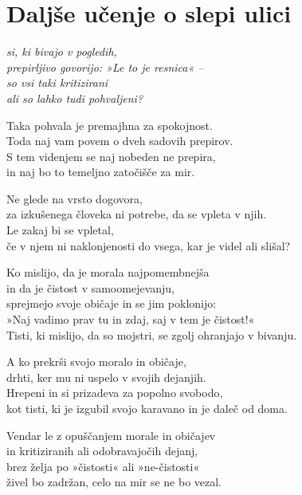 \cleartorecto
{}
\chapter{Daljše učenje o slepi ulici}

\enlargethispage*{\baselineskip}

\emph{si, ki bivajo v pogledih,\\
prepirljivo govorijo: »Le to je resnica« --\\
so vsi taki kritizirani\\
ali so lahko tudi pohvaljeni?}

Taka pohvala je premajhna za spokojnost.\\
Toda naj vam povem o dveh sadovih prepirov.\\
S tem videnjem se naj nobeden ne prepira,\\
in naj bo to temeljno zatočišče za mir.

Ne glede na vrsto dogovora,\\
za izkušenega človeka ni potrebe, da se vpleta v njih.\\
Le zakaj bi se vpletal,\\
če v njem ni naklonjenosti do vsega, kar je videl ali slišal?

Ko mislijo, da je morala najpomembnejša\\\vin in da je čistost v samoomejevanju,\\
sprejmejo svoje običaje in se jim poklonijo:\\
»Naj vadimo prav tu in zdaj, saj v tem je čistost!«\\
Tisti, ki mislijo, da so mojstri, se zgolj ohranjajo v bivanju.


\clearpage

A ko prekrši svojo moralo in običaje,\\
drhti, ker mu ni uspelo v svojih dejanjih.\\
Hrepeni in si prizadeva za popolno svobodo,\\
kot tisti, ki je izgubil svojo karavano in je daleč od doma.

Vendar le z opuščanjem morale in običajev\\
in kritiziranih ali odobravajočih dejanj,\\
brez želja po »čistosti« ali »ne-čistosti«\\
živel bo zadržan, celo na mir se ne bo vezal.

